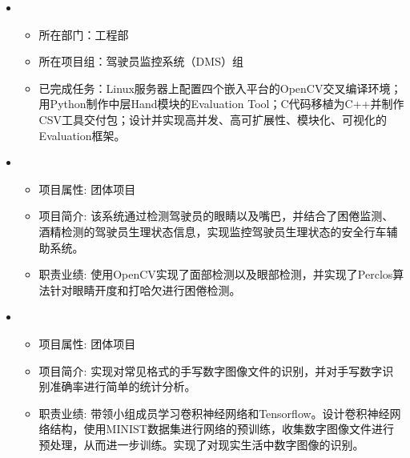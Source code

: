   \begin{itemize}[leftmargin=*]
    \item 
        {\small
      \begin{itemize}
        \item 所在部门：工程部
        \item 所在项目组：驾驶员监控系统（DMS）组
        \item 已完成任务：Linux服务器上配置四个嵌入平台的OpenCV交叉编译环境；用Python制作中层Hand模块的Evaluation Tool；C代码移植为C++并制作CSV工具交付包；设计并实现高并发、高可扩展性、模块化、可视化的Evaluation框架。
      \end{itemize}
      }
    \item
      {\small
      \begin{itemize}
        \item 项目属性: 团体项目
        \item 项目简介: 该系统通过检测驾驶员的眼睛以及嘴巴，并结合了困倦监测、酒精检测的驾驶员生理状态信息，实现监控驾驶员生理状态的安全行车辅助系统。
        \item 职责业绩: 使用OpenCV实现了面部检测以及眼部检测，并实现了Perclos算法针对眼睛开度和打哈欠进行困倦检测。
      \end{itemize}
      }
    \item
      {\small
      \begin{itemize}
        \item 项目属性: 团体项目
        \item 项目简介: 实现对常见格式的手写数字图像文件的识别，并对手写数字识别准确率进行简单的统计分析。
        \item 职责业绩: 带领小组成员学习卷积神经网络和Tensorflow。设计卷积神经网络结构，使用MINIST数据集进行网络的预训练，收集数字图像文件进行预处理，从而进一步训练。实现了对现实生活中数字图像的识别。
      \end{itemize}
      }

\end{itemize}
